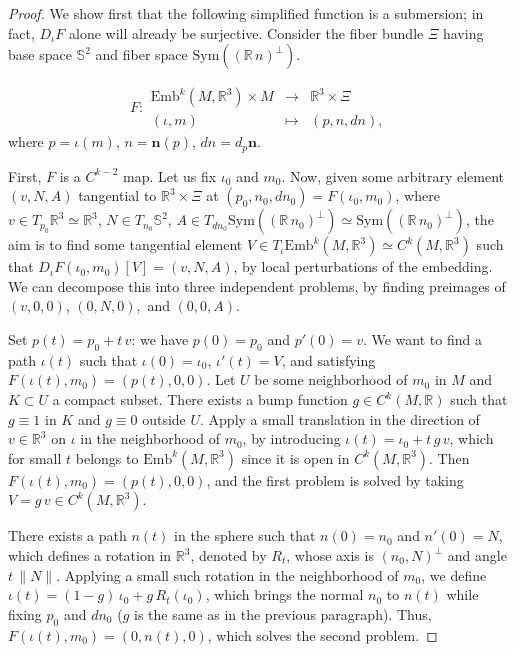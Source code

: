\documentclass[11pt]{article}
\newcommand{\R}{\mathbb{R}}
\newcommand{\io}{\iota}
\newcommand{\nbf}{\mathbf{n}}
\newcommand{\Emb}{\mathrm{Emb}^k(M,\R^3)}
\theoremstyle{plain}
\theoremstyle{definition}
\theoremstyle{remark}
\begin{document}
	\begin{proof}
		We show first that the following simplified function is a submersion; in fact, $D_\io F$ alone will already be surjective. Consider the fiber bundle $\Xi$ having base space $\mathbb{S}^2$ and fiber space $\mathrm{Sym}((\R \, n)^\perp)$.
		
		\begin{equation}
			F:
			\begin{array}{ccc}
				\Emb \times M & \to & \R^3 \times \Xi \\
				(\io, m) & \mapsto & (p, n, dn),
			\end{array}
		\end{equation}
		where $p = \io(m)$, $n = \nbf(p)$, $dn =  d_{p}\nbf$.
		
		First, $F$ is a $C^{k-2}$ map.
		Let us fix $\io_0$ and $m_0$.
		Now, given some arbitrary element $(v, N, A)$ tangential to $\R^3 \times \Xi$ at $(p_0,n_0, dn_0) = F(\io_0,m_0)$, where $v \in T_{p_0} \R^3 \simeq \R^3$, $N \in T_{n_0} \mathbb{S}^2$, $A \in T_{dn_0} \mathrm{Sym}((\R \, n_0)^\perp) \simeq \mathrm{Sym}((\R \, n_0)^\perp)$, the aim is to find some tangential element $V \in T_\io \Emb \simeq C^k(M,\R^3)$ such that $D_\io F(\io_0,m_0) [V] = (v,N,A)$, by local perturbations of the embedding. We can decompose this into three independent problems, by finding preimages of $(v,0,0)$, $(0,N,0),$ and $(0,0,A)$. 
		
		Set $p(t) = p_0 + t \, v$: we have $p(0) = p_0$ and $p'(0) = v$. We want to find a path $\io(t)$ such that $\io(0) = \io_0$, $\io'(t) = V$, and satisfying $F(\io(t),m_0) = (p(t),0,0)$.
		Let $U$ be some neighborhood of $m_0$ in $M$ and $K \subset U$ a compact subset. There exists a bump function $g \in C^k(M,\R)$ such that $g \equiv 1$ in $K$ and $g \equiv 0$ outside $U$.
		Apply a small translation in the direction of $v \in \R^3$ on $\io$ in the neighborhood of $m_0$, by introducing $\io(t) = \io_0 + t \, g \, v$, which for small $t$ belongs to $\Emb$ since it is open in $C^k(M,\R^3)$. Then $F(\io(t),m_0) = (p(t),0,0)$, and the first problem is solved by taking $V = g \, v \in C^k(M,\R^3)$.
		
		There exists a path $n(t)$ in the sphere such that $n(0) = n_0$ and $n'(0) = N$, which defines a rotation in $\R^3$, denoted by $R_t$, whose axis is $(n_0,N)^\perp$ and angle $t \, \|N\|$. Applying a small such rotation in the neighborhood of $m_0$, we define $\io(t) = (1-g) \, \io_0 + g \, R_t(\io_0)$, which brings the normal $n_0$ to $n(t)$ while fixing $p_0$ and $dn_0$ ($g$ is the same as in the previous paragraph). Thus, $F(\io(t),m_0) = (0,n(t),0)$, which solves the second problem.
		

\end{proof}
\end{document}
